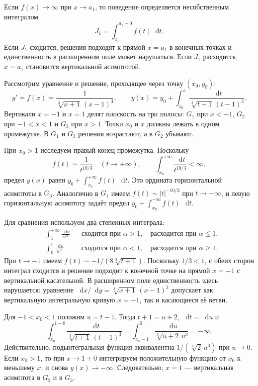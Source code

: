 \documentclass[12pt,a4paper]{article}
\numberwithin{equation}{section}
\newcommand{\dd}{\mathop{}\!\mathrm{d}}
\begin{document}
Если $f(x)\to\infty$ при $x\to a_1$, то поведение определяется несобственным интегралом
\[
J_1=\int_{x_0}^{a_1-0}f(t)\dd t.
\]
Если $J_1$ сходится, решения подходят к прямой $x=a_1$ в конечных точках и единственность в расширенном поле может нарушаться. Если $J_1$ расходится, $x=a_1$ становится вертикальной асимптотой.

\begin{exampleHSE}
Рассмотрим уравнение и решение, проходящее через точку $(x_0,y_0)$:
\[
 y'=f(x)=\frac{1}{\sqrt[3]{x+1}\,(x-1)^3},\qquad
 y(x)=y_0+\int_{x_0}^x\frac{\dd t}{\sqrt[3]{t+1}\,(t-1)^3}.
\]
Вертикали $x=-1$ и $x=1$ делят плоскость на три полосы:
$G_1$ при $x<-1$, $G_2$ при $-1<x<1$ и $G_3$ при $x>1$.
Точки $x_0$ и $x$ должны лежать в одном промежутке.
В $G_1$ и $G_3$ решения возрастают, а в $G_2$ убывают.

При $x_0>1$ исследуем правый конец промежутка. Поскольку
\[
 f(t)\sim \frac{1}{t^{10/3}}\quad(t\to+\infty),\qquad
 \int_{x_0}^{+\infty}\frac{\dd t}{t^{10/3}}<\infty,
\]
предел $y(x)$ равен $y_0+\int_{x_0}^{+\infty} f(t)\,\dd t$.
Это ордината горизонтальной асимптоты в $G_3$. Аналогично в $G_1$
имеем $f(t)\sim |t|^{-10/3}$ при $t\to-\infty$, и левую горизонтальную
асимптоту задаёт предел $y_0+\int_{x_0}^{-\infty} f(t)\,\dd t$.

Для сравнения используем два степенных интеграла:
\[
 \begin{aligned}
 &\int_1^{+\infty}\frac{\dd u}{u^\alpha}
 &&\text{сходится при }\alpha>1,\quad\text{расходится при }\alpha\le1,\\
 &\int_0^1\frac{\dd u}{u^\alpha}
 &&\text{сходится при }\alpha<1,\quad\text{расходится при }\alpha\ge1.
 \end{aligned}
\]
При $t\to-1$ имеем $f(t)\sim-1/(8\sqrt[3]{t+1})$.
Поскольку $1/3<1$, с обеих сторон интеграл сходится и решение
подходит к конечной точке на прямой $x=-1$ с вертикальной касательной.
В расширенном поле единственность здесь нарушается: уравнение
$\dd x/\dd y=\sqrt[3]{x+1}\,(x-1)^3$ допускает как вертикальную
интегральную кривую $x=-1$, так и касающиеся её ветви.

Для $-1<x_0<1$ положим $u=t-1$. Тогда $t+1=u+2$, $\dd t=\dd u$ и
\[
 \int_{x_0}^{1-0}\frac{\dd t}{\sqrt[3]{t+1}\,(t-1)^3}
 =\int_{x_0-1}^{0^-}\frac{\dd u}{\sqrt[3]{u+2}\,u^3}
 =-\infty.
\]
Действительно, подынтегральная функция эквивалентна
$1/(\sqrt[3]{2}\,u^3)$ при $u\to0$.
Если $x_0>1$, то при $x\to1+0$ интегрируем положительную функцию
от $x_0$ к меньшему $x$, и снова $y(x)\to-\infty$.
Следовательно, $x=1$ --- вертикальная асимптота в $G_2$ и в $G_3$.


\end{exampleHSE}
\end{document}
